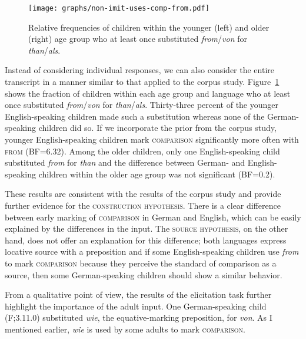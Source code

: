 \documentclass[lucida]{sp} %
\begin{document}
\begin{figure}
\hspace{0.25\textwidth}\texttt{[image: graphs/non-imit-uses-comp-from.pdf]}
\caption{Relative frequencies of children within the younger (left) and older (right) age group who at least once substituted  \textit{from}/\textit{von} for \textit{than}/\textit{als}.}\label{fig:soc-children}
\end{figure}

Instead of considering individual responses, we can also consider the entire transcript in a manner similar to that applied to the corpus study. Figure~\ref{fig:soc-children} shows the fraction of children within each age group and language who at least once substituted \textit{from}/\textit{von} for \textit{than}/\textit{als}.  Thirty-three percent of the younger English-speaking children made such a substitution whereas none of the German-speaking children did so. If we incorporate the prior from the corpus study, younger English-speaking children mark \textsc{comparison} significantly more often with \textsc{from} (BF=6.32). Among the older children, only one English-speaking child substituted \textit{from} for \textit{than} and the difference between German- and English-speaking children within the older age group was not significant (BF=0.2).

These results are consistent with the results of the corpus study and provide further evidence for the \textsc{construction hypothesis}. There is a clear difference between early marking of \textsc{comparison} in German and English, which can be easily explained by the differences in the input. The \textsc{source hypothesis}, on the other hand, does not offer an explanation for this difference; both languages express locative source with a preposition and if some English-speaking children use \textit{from} to mark \textsc{comparison} because they perceive the standard of comparison as a source, then some German-speaking children should show a similar behavior. 

From a qualitative point of view, the results of the elicitation task further highlight the importance of the adult input. One German-speaking child (F;3.11.0) substituted \textit{wie}, the equative-marking preposition, for \textit{von}. As I mentioned earlier, \textit{wie} is used by some adults to mark \textsc{comparison}.
\end{document}
